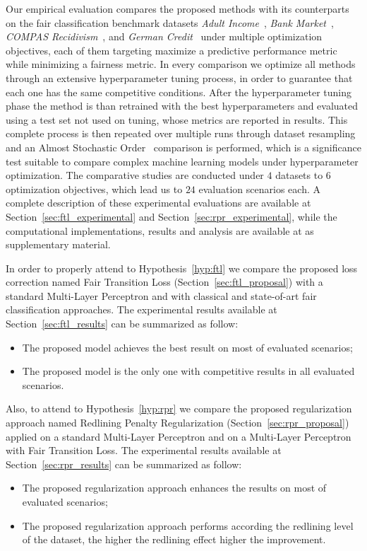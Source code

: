 Our empirical evaluation compares the proposed methods with its counterparts on the fair classification benchmark datasets \textit{Adult Income}~\citep{misc_adult_2}, \textit{Bank Market}~\citep{misc_bank_marketing_222}, \textit{COMPAS Recidivism}~\citep{misc_compas}, and \textit{German Credit}~\citep{misc_statlog_(german_credit_data)_144} under multiple optimization objectives, each of them targeting maximize a predictive performance metric while minimizing a fairness metric. In every comparison we optimize all methods through an extensive hyperparameter tuning process, in order to guarantee that each one has the same competitive conditions. After the hyperparameter tuning phase the method is than retrained with the best hyperparameters and evaluated using a test set not used on tuning, whose metrics are reported in results. This complete process is then repeated over multiple runs through dataset resampling and an Almost Stochastic Order~\citep{dror2019deep} comparison is performed, which is a significance test suitable to compare complex machine learning models under hyperparameter optimization. The comparative studies are conducted under $4$ datasets to $6$ optimization objectives, which lead us to $24$ evaluation scenarios each. A complete description of these experimental evaluations are available at Section~\ref{sec:ftl_experimental} and Section~\ref{sec:rpr_experimental}, while the computational implementations, results and analysis are available at \cite{canalli2024_zenodo} as supplementary material.

In order to properly attend to Hypothesis~\ref{hyp:ftl} we compare the proposed loss correction named Fair Transition Loss (Section~\ref{sec:ftl_proposal}) with a standard Multi-Layer Perceptron and with classical and state-of-art fair classification approaches. The experimental results available at Section~\ref{sec:ftl_results} can be summarized as follow:
\begin{itemize}
    \item The proposed model achieves the best result on most of evaluated scenarios;
    \item The proposed model is the only one with competitive results in all evaluated scenarios.
\end{itemize}

Also, to attend to Hypothesis~\ref{hyp:rpr} we compare the proposed regularization approach named Redlining Penalty Regularization (Section~\ref{sec:rpr_proposal}) applied on a standard Multi-Layer Perceptron and on a Multi-Layer Perceptron with Fair Transition Loss. The experimental results available at Section~\ref{sec:rpr_results} can be summarized as follow:
\begin{itemize}
    \item The proposed regularization approach enhances the results on most of evaluated scenarios;
    \item The proposed regularization approach performs according the redlining level of the dataset, the higher the redlining effect higher the improvement.
\end{itemize}

